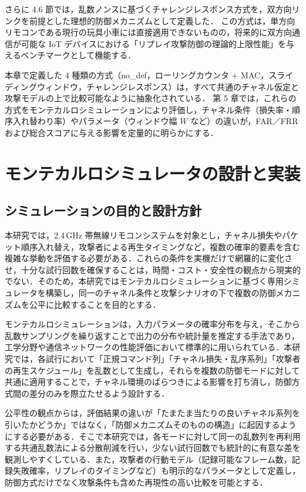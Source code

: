 \documentclass[twocolumn,10pt,a4paper]{jsarticle}
\begin{document}
さらに 4.6 節では，乱数ノンスに基づくチャレンジレスポンス方式を，双方向リンクを前提とした理想的防御メカニズムとして定義した．
この方式は，単方向リモコンである現行の玩具小車には直接適用できないものの，将来的に双方向通信が可能な IoT デバイスにおける「リプレイ攻撃防御の理論的上限性能」を与えるベンチマークとして機能する．

本章で定義した 4 種類の方式（no\_def，ローリングカウンタ + MAC，スライディングウィンドウ，チャレンジレスポンス）は，すべて共通のチャネル仮定と攻撃モデルの上で比較可能なように抽象化されている．
第 5 章では，これらの方式をモンテカルロシミュレーションにより評価し，チャネル条件（損失率・順序入れ替わり率）やパラメータ（ウィンドウ幅 $W$ など）の違いが，FAR／FRR および総合スコアに与える影響を定量的に明らかにする．

\section{モンテカルロシミュレータの設計と実装}

\subsection{シミュレーションの目的と設計方針}

本研究では，2.4\,GHz 帯無線リモコンシステムを対象とし，チャネル損失やパケット順序入れ替え，攻撃者による再生タイミングなど，複数の確率的要素を含む複雑な挙動を評価する必要がある．これらの条件を実機だけで網羅的に変化させ，十分な試行回数を確保することは，時間・コスト・安全性の観点から現実的でない．そのため，本研究ではモンテカルロシミュレーション\cite{Raychaudhuri2008MC,Law2007Simulation}に基づく専用シミュレータを構築し，同一のチャネル条件と攻撃シナリオの下で複数の防御メカニズムを公平に比較することを目的とする．

モンテカルロシミュレーションは，入力パラメータの確率分布を与え，そこから乱数サンプリングを繰り返すことで出力の分布や統計量を推定する手法であり，工学分野や通信ネットワークの性能評価において標準的に用いられている\cite{Raychaudhuri2008MC,Law2007Simulation}．本研究では，各試行において「正規コマンド列」「チャネル損失・乱序系列」「攻撃者の再生スケジュール」を乱数として生成し，それらを複数の防御モードに対して共通に適用することで，チャネル環境のばらつきによる影響を打ち消し，防御方式間の差分のみを際立たせるよう設計する．

公平性の観点からは，評価結果の違いが「たまたま当たりの良いチャネル系列を引いたかどうか」ではなく，「防御メカニズムそのものの構造」に起因するようにする必要がある．そこで本研究では，各モードに対して同一の乱数列を再利用する共通乱数法による分散削減を行い，少ない試行回数でも統計的に有意な差を観測しやすくしている．また，攻撃者の行動モデル（記録可能なフレーム数，記録失敗確率，リプレイのタイミングなど）も明示的なパラメータとして定義し，防御方式だけでなく攻撃条件も含めた再現性の高い比較を可能とする．
\end{document}
